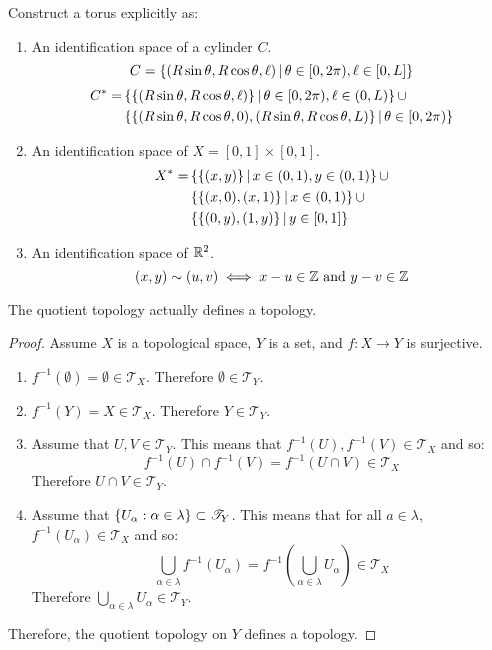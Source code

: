 \documentclass[letterpaper,12pt,fleqn]{article}
\newcommand{\T}{\mathscr{T}}
\renewcommand{\a}{\alpha}
\renewcommand{\l}{\lambda}
\renewcommand{\O}{\theta}
\begin{document}
\begin{example}[Exercise 7.45]
  Construct a torus explicitly as:
  \begin{enumerate}
  \item An identification space of a cylinder \(C\).
    \[C=\setb{(R\sin\O,R\cos\O,\ell)}{\O\in[0,2\pi),\ell\in[0,L]}\]
    \begin{align*}
      C^* =& \setb{\set{(R\sin\O,R\cos\O,\ell)}}{\O\in[0,2\pi),\ell\in(0,L)}\cup \\
      & \setb{\set{(R\sin\O,R\cos\O,0),(R\sin\O,R\cos\O,L)}}{\O\in[0,2\pi)}
    \end{align*}
  \item An identification space of \(X=[0,1]\times[0,1]\).
    \begin{align*}
      X^* =& \left\{{\{(x,y)\}}\,\middle|\,{x\in(0,1),y\in(0,1)}\right\}\cup \\
      & \left\{{\{(x,0),(x,1)\}}\,\middle|\,{x\in(0,1)}\right\}\cup \\
      & \left\{{\{(0,y),(1,y)\}}\,\middle|\,{y\in[0,1]}\right\}
    \end{align*}
  \item An identification space of \(\mathbb{R}^2\).
    \[(x,y)\sim(u,v)\iff x-u\in\Z\ \text{and}\ y-v\in\Z\]
  \end{enumerate}
\end{example}

\begin{theorem}[7.47]
  The quotient topology actually defines a topology.
\end{theorem}

\begin{proof}
  Assume \(X\) is a topological space, \(Y\) is a set, and \(f:X\to Y\) is surjective.
  \begin{enumerate}
  \item \(f^{-1}(\emptyset)=\emptyset\in\T_X\).  Therefore \(\emptyset\in\T_Y\).

  \item \(f^{-1}(Y)=X\in\T_X\).  Therefore \(Y\in\T_Y\).

  \item Assume that \(U,V\in\T_Y\).  This means that \(f^{-1}(U),f^{-1}(V)\in\T_X\) and so:
    \[f^{-1}(U)\cap f^{-1}(V)=f^{-1}(U\cap V)\in\T_X\]
    Therefore \(U\cap V\in\T_Y\).

  \item Assume that \(\set{U_{\a}:\a\in\l}\subset\T_Y\).  This means that for all \(a\in\l\),
    \(f^{-1}(U_{\a})\in\T_X\) and so:
    \[\bigcup_{\a\in\l}f^{-1}(U_{\a})=f^{-1}(\bigcup_{\a\in\l}U_{\a})\in\T_X\]
    Therefore \(\bigcup_{\a\in\l}U_{\a}\in\T_Y\).
  \end{enumerate}

  Therefore, the quotient topology on \(Y\) defines a topology.
\end{proof}
\end{document}
